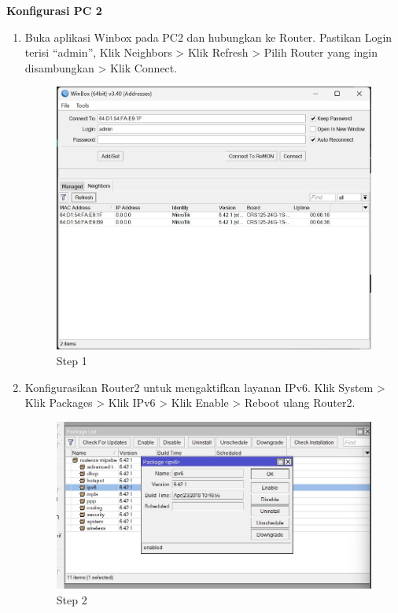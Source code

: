\begin{enumerate}
\end{enumerate}

\begin{center} 
	\textbf{Konfigurasi PC 2}
\end{center}

\begin{enumerate}
	\item Buka aplikasi Winbox pada PC2 dan hubungkan ke Router. Pastikan Login terisi “admin”, Klik
	Neighbors > Klik Refresh > Pilih Router yang ingin disambungkan > Klik Connect.
	
	\begin{figure}[H]
		\centering
		\includegraphics[width=0.7\linewidth]{P5/img/step1.jpg}
		\caption{Step 1}
		\label{fig:gambar1}
	\end{figure}

	\item Konfigurasikan Router2 untuk mengaktifkan layanan IPv6. Klik System > Klik Packages > Klik
	IPv6 > Klik Enable > Reboot ulang Router2.	
	
	\begin{figure}[H]
		\centering
		\includegraphics[width=0.7\linewidth]{P5/img/2step2.jpg}
		\caption{Step 2}
		\label{fig:gambar1}
	\end{figure}


\end{enumerate}
